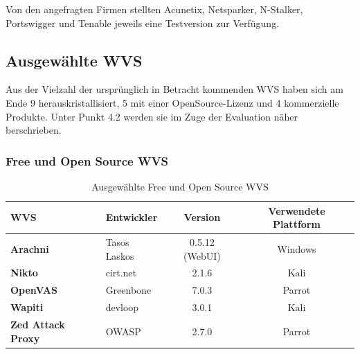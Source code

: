 \documentclass[12pt,oneside,a4paper,parskip]{scrbook}
\begin{document}
  Von den angefragten Firmen stellten Acunetix, Netsparker, N-Stalker, Portswigger und Tenable jeweils eine Testversion zur Verfügung.

  \subsection{Ausgewählte WVS}
  Aus der Vielzahl der ursprünglich in Betracht kommenden WVS haben sich am Ende 9 herauskristallisiert, 5 mit einer OpenSource-Lizenz und 4 kommerzielle Produkte. Unter Punkt 4.2 werden sie im Zuge der Evaluation näher berschrieben.
    \subsubsection{Free und Open Source WVS}
      \begin{table}[H]
        \centering
          \begin{tabular}{|l|l|c|c|}
            \hline
            \textbf{WVS}              & \textbf{Entwickler}  & \textbf{Version}     & \textbf{Verwendete Plattform}  \\
            \hline
            \textbf{Arachni}          & Tasos Laskos         & 0.5.12 (WebUI)       & Windows                       \\
            \hline
            \textbf{Nikto}            & cirt.net             & 2.1.6                & Kali                          \\
            \hline
            \textbf{OpenVAS}          & Greenbone            & 7.0.3                & Parrot                        \\
            \hline
            \textbf{Wapiti}           & devloop              & 3.0.1                & Kali                          \\
            \hline
            \textbf{Zed Attack Proxy} & OWASP                & 2.7.0                & Parrot                        \\
            \hline
          \end{tabular}
        \caption[Ausgewählte Free und Open Source WVS]{Ausgewählte Free und Open Source WVS}
      \end{table}
\end{document}
